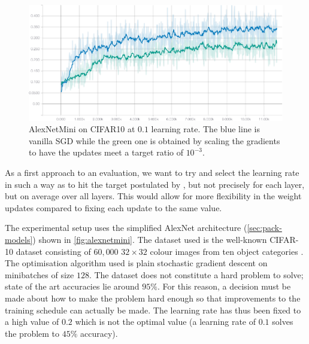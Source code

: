 \begin{figure}
    \centering
    \includegraphics[width=\linewidth]{gfx/diagrams/experiments/ratio_loss_correlation/alexnetmini_sgd_fixed_ratio_01.pdf}
    \caption[Fixed-Ratio optimisation with AlexNetMini on CIFR10]{AlexNetMini on CIFAR10 at $0.1$ learning rate. The blue line is
    vanilla SGD while the green one is obtained by scaling the gradients to have
the updates meet a target ratio of $10^{-3}$.}
    \label{fig:fixed-ratio-opt}
\end{figure}

As a first approach to an evaluation, we want to try and select the learning
rate in such a way as to hit the target postulated by
\citeauthor{karpathycs231n}, but not precisely for each layer, but on average
over all layers. This would allow for more flexibility in the weight updates
compared to fixing each update to the same value.

The experimental setup uses the simplified AlexNet architecture
(\cref{sec:pack-models}) shown in \cref{fig:alexnetmini}. The dataset used is
the well-known CIFAR-10 dataset consisting of $60,000$ $32\times32$ colour images
from ten object categories \citep{krizhevsky2009learning}. The optimisation
algorithm used is plain stochastic gradient descent on minibatches of size $128$. The
dataset does not constitute a hard problem to solve; state of the art accuracies
lie around $95\%$. For this reason, a decision must be made about how to make
the problem hard enough so that improvements to the training schedule can
actually be made. The learning rate has thus been fixed to a high value of $0.2$
which is not the optimal value (a learning rate of $0.1$ solves the problem to
$45\%$ accuracy).

